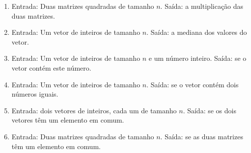 \documentclass[12pt]{article}
\begin{document}
\begin{enumerate}
\begin{enumerate}
\item Entrada: Duas matrizes quadradas de tamanho $n$. Saída: a multiplicação das duas matrizes.

\item Entrada: Um vetor de inteiros de tamanho $n$. Saída: a mediana dos valores do vetor.

\item Entrada: Um vetor de inteiros de tamanho $n$ e um número inteiro. Saída: se o vetor contém este número.

\item Entrada: Um vetor de inteiros de tamanho $n$. Saída: se o vetor contém dois números iguais.

\item Entrada: dois vetores de inteiros, cada um de tamanho $n$. Saída: se os dois vetores têm um elemento em comum.

\item Entrada: Duas matrizes quadradas de tamanho $n$. Saída: se as duas matrizes têm um elemento em comum.



\end{enumerate}



\end{enumerate}
\end{document}
